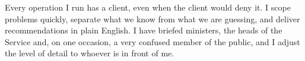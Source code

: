 
Every operation I run has a client, even when the client would deny it. I scope problems quickly, separate what we know from what we are guessing, and deliver recommendations in plain English. I have briefed ministers, the heads of the Service and, on one occasion, a very confused member of the public, and I adjust the level of detail to whoever is in front of me.

